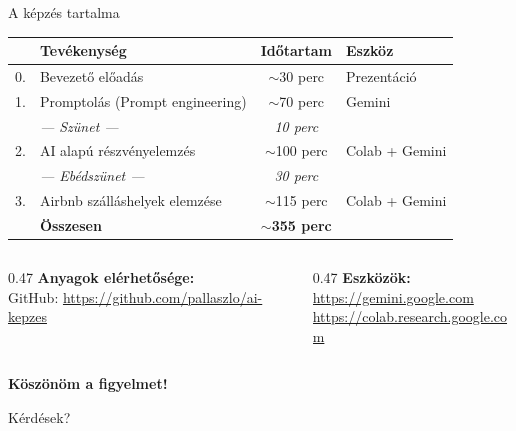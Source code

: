 \documentclass[aspectratio=169, 12pt]{beamer}
\begin{document}
\begin{frame}{A képzés tartalma}
  \centering
  \vspace{0.5cm}
  {\footnotesize
  \begin{tabular}{clcl}
    \toprule
    & \textbf{Tevékenység} & \textbf{Időtartam} & \textbf{Eszköz} \\
    \midrule
    0. & Bevezető előadás & $\sim$30 perc & Prezentáció \\
    1. & Promptolás (Prompt engineering) & $\sim$70 perc & Gemini \\
    & \textit{--- Szünet ---} & \textit{10 perc} & \\
    2. & AI alapú részvényelemzés & $\sim$100 perc & Colab + Gemini \\
    & \textit{--- Ebédszünet ---} & \textit{30 perc} & \\
    3. & Airbnb szálláshelyek elemzése & $\sim$115 perc & Colab + Gemini \\
    \midrule
    & \textbf{Összesen} & \textbf{$\sim$355 perc} & \\
    \bottomrule
  \end{tabular}
  }

  \vspace{0.8cm}

  \begin{columns}[T,onlytextwidth]
    \begin{column}{0.47\textwidth}
      \centering
      \textbf{Anyagok elérhetősége:}\\[0.3cm]
      GitHub: {\small\url{https://github.com/pallaszlo/ai-kepzes}}
    \end{column}
    \begin{column}{0.47\textwidth}
      \centering
      \textbf{Eszközök:}\\[0.3cm]
      {\small\url{https://gemini.google.com}}\\
      {\small\url{https://colab.research.google.com}}
    \end{column}
  \end{columns}
\end{frame}

\begin{frame}[plain]
  \vfill
  \centering
  {\Huge\bfseries Köszönöm a figyelmet!}

  \vspace{1cm}

  {\large Kérdések?}
  \vfill
\end{frame}
\end{document}
